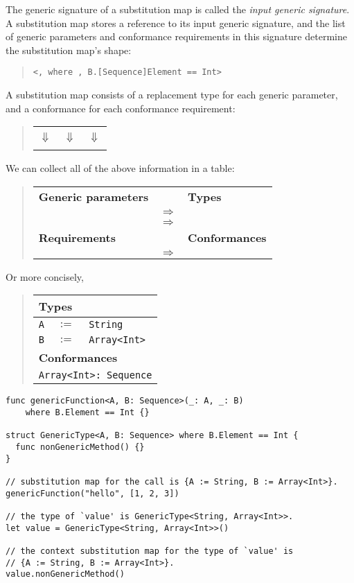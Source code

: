 \documentclass[a4paper,headsepline,bibliography=totoc,toc=flat,fleqn,twoside=semi]{scrbook}
\theoremstyle{definition}
\theoremstyle{definition}
\theoremstyle{definition}
\newcommand{\ttbox}[1]{\boxed{\mbox{\vphantom{pI\texttt{pI}}\texttt{#1}}}}
\newcommand{\SubMapC}[2]{\begin{tabular}{|lll|}
\hline
\multicolumn{3}{|l|}{\textbf{Types}}\\
\hline
#1\\
\hline
\hline
\multicolumn{3}{|l|}{\textbf{Conformances}}\\
\hline
#2\\
\hline
\end{tabular}}
\newcommand{\SubType}[2]{\texttt{#1}&$:=$&\texttt{#2}}
\newcommand{\SubConf}[1]{\multicolumn{3}{|l|}{\texttt{#1}}}
\begin{document}
The generic signature of a substitution map is called the \emph{input generic signature}. A substitution map stores a reference to its input generic signature, and the list of generic parameters and conformance requirements in this signature determine the substitution map's shape:
\begin{quote}
\texttt{<\ttbox{A}, \ttbox{B} where \ttbox{B:\ Sequence}, B.[Sequence]Element == Int>}
\end{quote}
A substitution map consists of a replacement type for each generic parameter, and a conformance for each conformance requirement:
\begin{quote}
\begin{tabular}{ccc}
\ttbox{A}&\ttbox{B}&\ttbox{B:\ Sequence}\\
$\Downarrow$&$\Downarrow$&$\Downarrow$\\
\ttbox{String}&\ttbox{Array<Int>}&\ttbox{Array<Int>:\ Sequence}
\end{tabular}
\end{quote}
We can collect all of the above information in a table:
\begin{quote}
\begin{tabular}{|lcl|}
\hline
\textbf{Generic parameters}&&\textbf{Types}\\[\smallskipamount]
\ttbox{A}&$\Rightarrow$&\ttbox{String}\\[\medskipamount]
\ttbox{B}&$\Rightarrow$&\ttbox{Array<Int>}\\[\medskipamount]
\textbf{Requirements}&&\textbf{Conformances}\\[\smallskipamount]
\ttbox{B:\ Sequence}&$\Rightarrow$&\ttbox{Array<Int>:\ Sequence}\\[\medskipamount]
\hline
\end{tabular}
\end{quote}
Or more concisely,
\begin{quote}
\SubMapC{
\SubType{A}{String}\\
\SubType{B}{Array<Int>}
}{
\SubConf{Array<Int>:\ Sequence}
}
\end{quote}

\begin{listing}\label{substmaptypecheck}
\begin{Verbatim}
func genericFunction<A, B: Sequence>(_: A, _: B)
    where B.Element == Int {}

struct GenericType<A, B: Sequence> where B.Element == Int {
  func nonGenericMethod() {}
}

// substitution map for the call is {A := String, B := Array<Int>}.
genericFunction("hello", [1, 2, 3])

// the type of `value' is GenericType<String, Array<Int>>.
let value = GenericType<String, Array<Int>>()

// the context substitution map for the type of `value' is
// {A := String, B := Array<Int>}.
value.nonGenericMethod()
\end{Verbatim}
\end{listing}
\end{document}
